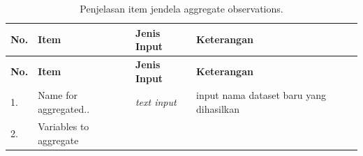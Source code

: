 \documentclass[12pt,]{krantz}
\begin{document}
\begin{longtable}[]{@{}llll@{}}
\caption{\label{tab:agregat} Penjelasan item jendela aggregate observations.}\tabularnewline
\toprule
\begin{minipage}[b]{0.04\columnwidth}\raggedright
\textbf{No.}\strut
\end{minipage} & \begin{minipage}[b]{0.14\columnwidth}\raggedright
\textbf{Item}\strut
\end{minipage} & \begin{minipage}[b]{0.09\columnwidth}\raggedright
\textbf{Jenis Input}\strut
\end{minipage} & \begin{minipage}[b]{0.61\columnwidth}\raggedright
\textbf{Keterangan}\strut
\end{minipage}\tabularnewline
\midrule
\endfirsthead
\toprule
\begin{minipage}[b]{0.04\columnwidth}\raggedright
\textbf{No.}\strut
\end{minipage} & \begin{minipage}[b]{0.14\columnwidth}\raggedright
\textbf{Item}\strut
\end{minipage} & \begin{minipage}[b]{0.09\columnwidth}\raggedright
\textbf{Jenis Input}\strut
\end{minipage} & \begin{minipage}[b]{0.61\columnwidth}\raggedright
\textbf{Keterangan}\strut
\end{minipage}\tabularnewline
\midrule
\endhead
\begin{minipage}[t]{0.04\columnwidth}\raggedright
1.\strut
\end{minipage} & \begin{minipage}[t]{0.14\columnwidth}\raggedright
Name for aggregated..\strut
\end{minipage} & \begin{minipage}[t]{0.09\columnwidth}\raggedright
\emph{text input}\strut
\end{minipage} & \begin{minipage}[t]{0.61\columnwidth}\raggedright
input nama dataset baru yang dihasilkan\strut
\end{minipage}\tabularnewline
\begin{minipage}[t]{0.04\columnwidth}\raggedright
2.\strut
\end{minipage} & \begin{minipage}[t]{0.14\columnwidth}\raggedright
Variables to aggregate\strut
\end{minipage} & \begin{minipage}[t]{0.09\columnwidth}\raggedright

\end{minipage}
\end{longtable}
\end{document}

